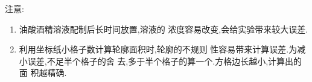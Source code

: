 \begin{enumerate}
注意:
\begin{enumerate}
\renewcommand{\labelenumii}{(\arabic{enumii})}
\item
油酸酒精溶液配制后长时间放置,溶液的
浓度容易改变,会给实验带来较大误差.


\item 
利用坐标纸小格子数计算轮廓面积时,轮廓的不规则
性容易带来计算误差.为减小误差,不足半个格子的舍
去,多于半个格子的算一个.方格边长越小,计算出的面
积越精确.



\end{enumerate}


\end{enumerate}	


